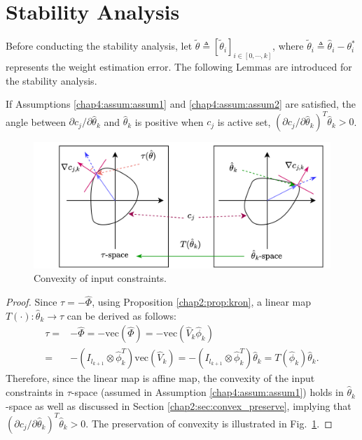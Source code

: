 \section{Stability Analysis} 

Before conducting the stability analysis, let $\tilde\theta\triangleq [\tilde\theta_i]_{i\in[0,\cdots,k]}$, where $\tilde\theta_i\triangleq\hat\theta_i-\theta^*_i$ represents the weight estimation error. 
The following Lemmas are introduced for the stability analysis. %
\begin{lemma}
    If Assumptions \ref{chap4:assum:assum1} and \ref{chap4:assum:assum2} are satisfied, the angle between $\partial c_j/\partial \hat\theta_k$ and $\hat\theta_k$ is positive when $c_j$ is active set, \ie $(\partial c_j/\partial \hat\theta_k)^T\hat\theta_k>0$.
    \label{chap4:lem:lem1}
\end{lemma}

\begin{figure}[!t]
   \centering
   \includegraphics[width=.9\linewidth]{imgs/spaces.drawio.png}
   \caption{Convexity of input constraints.}
   \label{chap4:fig:spaces}
\end{figure}

\begin{proof}

Since $\tau = -\hat\Phi$, using Proposition \ref{chap2:prop:kron}, a linear map $T(\cdot):\hat\theta_k\to\tau$ can be derived as follows: 
\begin{equation}
    \begin{aligned}
    \tau = &-\hat\Phi = -\text{vec}(\hat\Phi)     
    = -\text{vec}(\hat V_k \hat\phi_k) 
    \\
    = & -(I_{l_{k+1}}\otimes \hat\phi_k^T)\text{vec}(\hat V_k)
    =-(I_{l_{k+1}}\otimes \hat\phi_k^T)\hat\theta_k = T(\hat\phi_k) \hat\theta_k
    .
    \end{aligned}
    \label{chap4:eq:linear map}
\end{equation}
Therefore, since the linear map is affine map, the convexity of the input constraints in $\tau$-space (assumed in Assumption \ref{chap4:assum:assum1}) holds in $\hat\theta_k$-space as well as discussed in Section \ref{chap2:sec:convex_preserve}, implying that $(\partial c_j/\partial \hat\theta_k)^T\hat\theta_k>0$.
The preservation of convexity is illustrated in Fig.~\ref{chap4:fig:spaces}.

\end{proof}

